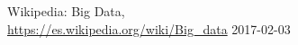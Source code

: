\documentclass{subfiles}
\begin{document}
  \begin{thebibliography}{9}

    Wikipedia: Big Data, \\
    \url{https://es.wikipedia.org/wiki/Big_data} 2017-02-03
  \end{thebibliography}
\end{document}
